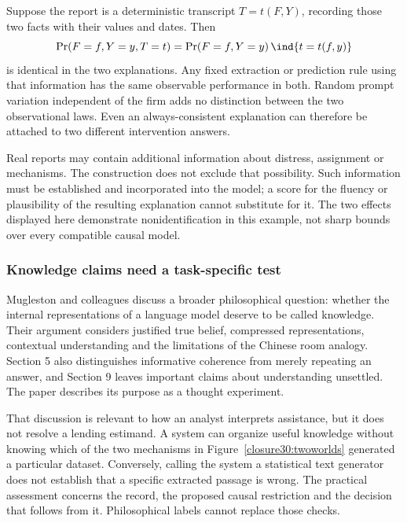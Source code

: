 Suppose the report is a deterministic transcript $T=t(F,Y)$, recording those
two facts with their values and dates. Then
\begin{equation}
 \Pr(F=f,Y=y,T=t)=\Pr(F=f,Y=y)\,\ind\{t=t(f,y)\}
\end{equation}
is identical in the two explanations. Any fixed extraction or prediction rule
using that information has the same observable performance in both. Random
prompt variation independent of the firm adds no distinction between the two
observational laws. Even an always-consistent explanation can therefore be
attached to two different intervention answers.

Real reports may contain additional information about distress, assignment
or mechanisms. The construction does not exclude that possibility. Such
information must be established and incorporated into the model; a score for
the fluency or plausibility of the resulting explanation cannot substitute
for it. The two effects displayed here demonstrate nonidentification in this
example, not sharp bounds over every compatible causal model.

\subsubsection{Knowledge claims need a task-specific test}

Mugleston and colleagues discuss a broader philosophical question: whether
the internal representations of a language model deserve to be called
knowledge. Their argument considers justified true belief, compressed
representations, contextual understanding and the limitations of the Chinese
room analogy. Section 5 also distinguishes informative coherence from merely
repeating an answer, and Section 9 leaves important claims about understanding
unsettled. The paper describes its purpose as a thought experiment.
\citep[Sections 3.3--6 and 9]{rel18mugleston}

That discussion is relevant to how an analyst interprets assistance, but it
does not resolve a lending estimand. A system can organize useful knowledge
without knowing which of the two mechanisms in Figure~\ref{closure30:twoworlds}
generated a particular dataset. Conversely, calling the system a statistical
text generator does not establish that a specific extracted passage is wrong.
The practical assessment concerns the record, the proposed causal restriction
and the decision that follows from it. Philosophical labels cannot replace
those checks.

